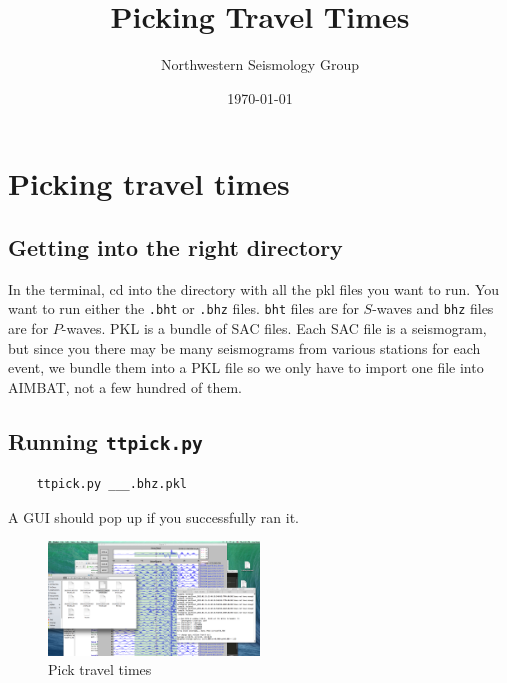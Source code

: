\documentclass[letterpaper,10pt]{article}
\title{Picking Travel Times}
\author{Northwestern Seismology Group}
\date{\today}
\begin{document}
\maketitle


\section{Picking travel times}


\subsection{Getting into the right directory}

In the terminal, cd into the directory with all the pkl files you want to run. You want to run either the \verb".bht" or \verb".bhz" files. \texttt{bht} files are for $S$-waves and \texttt{bhz} files are for $P$-waves. PKL is a bundle of SAC files. Each SAC file is a seismogram, but since you there may be many seismograms from various stations for each event, we bundle them into a PKL file so we only have to import one file into AIMBAT, not a few hundred of them.


\subsection{Running \texttt{ttpick.py}}

\begin{verbatim}
	ttpick.py ___.bhz.pkl
\end{verbatim}

A GUI should pop up if you successfully ran it.  

\begin{figure}[h!]
  \centering
  \includegraphics[width=0.5\textwidth]{images/pick_travel_times}
  \caption{Pick travel times}
  \label{fig:pick_travel_times}
\end{figure}
\end{document}
